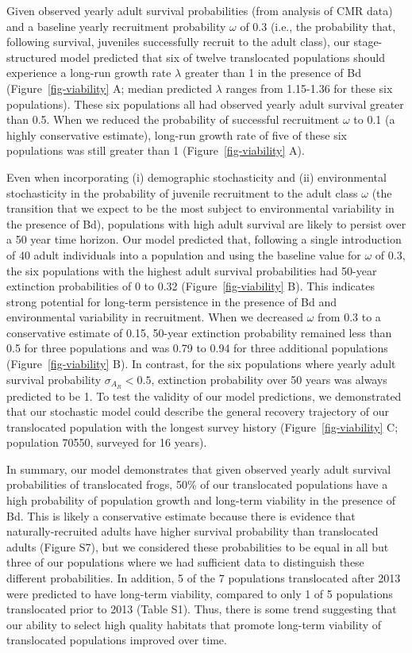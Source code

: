 \documentclass[9pt,twocolumn,twoside,lineno]{pnas-new}
\begin{document}
Given observed yearly adult survival probabilities (from analysis of CMR
data) and a baseline yearly recruitment probability \(\omega\) of 0.3
(i.e., the probability that, following survival, juveniles successfully
recruit to the adult class), our stage-structured model predicted that
six of twelve translocated populations should experience a long-run
growth rate \(\lambda\) greater than 1 in the presence of Bd
(Figure~\ref{fig-viability} A; median predicted \(\lambda\) ranges from
1.15-1.36 for these six populations). These six populations all had
observed yearly adult survival greater than 0.5. When we reduced the
probability of successful recruitment \(\omega\) to 0.1 (a highly
conservative estimate), long-run growth rate of five of these six
populations was still greater than 1 (Figure~\ref{fig-viability} A).

Even when incorporating (i) demographic stochasticity and (ii)
environmental stochasticity in the probability of juvenile recruitment
to the adult class \(\omega\) (the transition that we expect to be the
most subject to environmental variability in the presence of Bd),
populations with high adult survival are likely to persist over a 50
year time horizon. Our model predicted that, following a single
introduction of 40 adult individuals into a population and using the
baseline value for \(\omega\) of 0.3, the six populations with the
highest adult survival probabilities had 50-year extinction
probabilities of 0 to 0.32 (Figure~\ref{fig-viability} B). This
indicates strong potential for long-term persistence in the presence of
Bd and environmental variability in recruitment. When we decreased
\(\omega\) from 0.3 to a conservative estimate of 0.15, 50-year
extinction probability remained less than 0.5 for three populations and
was 0.79 to 0.94 for three additional populations
(Figure~\ref{fig-viability} B). In contrast, for the six populations
where yearly adult survival probability \(\sigma_{A_R} < 0.5\),
extinction probability over 50 years was always predicted to be 1. To
test the validity of our model predictions, we demonstrated that our
stochastic model could describe the general recovery trajectory of our
translocated population with the longest survey history
(Figure~\ref{fig-viability} C; population 70550, surveyed for 16 years).

In summary, our model demonstrates that given observed yearly adult
survival probabilities of translocated frogs, 50\% of our translocated
populations have a high probability of population growth and long-term
viability in the presence of Bd. This is likely a conservative estimate
because there is evidence that naturally-recruited adults have higher
survival probability than translocated adults
(Figure S7), but we considered these
probabilities to be equal in all but three of our populations where we
had sufficient data to distinguish these different probabilities. In
addition, 5 of the 7 populations translocated after 2013 were predicted
to have long-term viability, compared to only 1 of 5 populations
translocated prior to 2013 (Table S1). Thus,
there is some trend suggesting that our ability to select high quality
habitats that promote long-term viability of translocated populations
improved over time.
\end{document}
